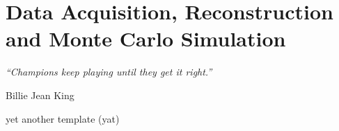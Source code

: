 \chapter{Data Acquisition,  Reconstruction and Monte Carlo Simulation}
\label{ch:DAQ}
\epigraph{\emph{“Champions keep playing until they get it right.”}}{Billie Jean King}

yet another template (yat)




